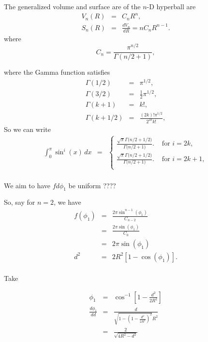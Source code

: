 The generalized volume and surface are of the $n$-D hyperball are
\begin{eqnarray}
 V_n(R) & = & C_n R^n,
  \label{eq:gen_vol} \\
 S_{n}(R) & = & \frac{dV_n}{dR} = n C_n R^{n-1}.
  \label{eq:gen_surf}
\end{eqnarray}
where
\begin{equation}
  \label{eq:cn}
   C_n = \frac{ \pi^{n/2} }{\Gamma(n/2 + 1)},
\end{equation}

where the Gamma function satisfies\cite[6.1.12]{Abramowitz_and_Stegun}
\begin{eqnarray}
  \label{eq:gamma}
  \Gamma(1/2) & = & \pi^{1/2}, \\
  \Gamma(3/2) & = & \frac{1}{2} \pi^{1/2}, \\
  \Gamma(k+1) & = & k!, \\
  \Gamma(k+1/2) & = & \frac{(2k)! \pi^{1/2}}{2^{2k} k!},
\end{eqnarray}
So we can write
\begin{eqnarray}
   \int_0^{\pi} \sin^i(x) \, dx
     & = & \left\{ \begin{array}{ll}
         \displaystyle
       \frac{\sqrt{\pi} \Gamma\big( n/2 + 1/2 \big)}{\Gamma\big( n/2+1 \big)}.
       & \mbox{ for } i = 2k, \\
         \displaystyle
       \frac{\sqrt{\pi} \Gamma\big( n/2 + 1/2 \big)}{\Gamma\big( n/2+1 \big)}.
       & \mbox{ for } i = 2k+1, \\
            \end{array} \right. \nonumber \\
\end{eqnarray}

We aim to have $f d\phi_1$ be uniform ????

So, say for $n=2$, we have
\begin{eqnarray}
  f(\phi_1)
      & = &   \frac{2 \pi \sin^{n-1}(\phi_1)}{C_{n-2}}
                 \nonumber \\   
      & = &   \frac{2 \pi \sin(\phi_1)}{C_{0}}
                 \nonumber \\   
      & = &   2 \pi \sin(\phi_1)  \nonumber \\   
  d^2 & = & 2 R^2 \left[ 1 - \cos(\phi_1) \right].  \nonumber \\  
\end{eqnarray}

Take 

\begin{eqnarray}
  \phi_1 & =  & \cos^{-1} \left[1-\frac{d^2}{2 R^2}\right]\\ 
   \frac {d \phi_1}{dd} & = &\frac{d}{\sqrt{1-\left(1-\frac{d^2}{2 R^2}\right)^2} R^2} \\
   & = &\frac{2}{\sqrt{4 R^2 -d^2 }}\\
\end{eqnarray}

